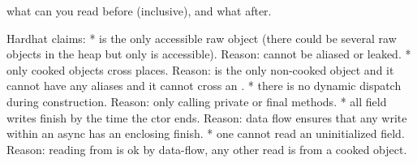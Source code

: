what can you read before (inclusive), and what after.


Hardhat claims:
* \this is the only accessible raw object (there could be several raw objects in the heap but only \this is accessible). Reason: \this cannot be aliased or leaked.
* only cooked objects cross places. Reason: \this is the only non-cooked object and it cannot have any aliases and it cannot cross an .
* there is no dynamic dispatch during construction. Reason: only calling private or final methods.
* all field writes finish by the time the ctor ends. Reason: data flow ensures that any write within an async has an enclosing finish.
* one cannot read an uninitialized field. Reason: reading from \this is ok by data-flow, any other read is from a cooked object.
